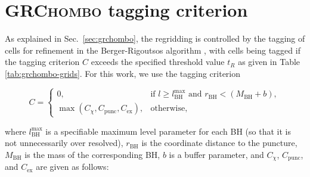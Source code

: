 \documentclass[floats,floatfix,showpacs,amssymb,physrev,twocolumn,superscriptaddress,reprint,
nofootinbib, longbibliography]{revtex4-2}
\begin{document}
\section{\textsc{GRChombo} tagging criterion}
\label{sec:tagging}
%
%
As explained in Sec.~\ref{sec:grchombo}, the regridding is controlled by 
the tagging of cells for refinement in the Berger-Rigoutsos algorithm 
\cite{Berger1991}, with cells being tagged if the tagging criterion $C$ 
exceeds the specified threshold value $t_R$ as given in Table 
\ref{tab:grchombo-grids}. For this work, we use the 
tagging criterion
\begin{widetext}
\begin{equation}
    C=
    \begin{cases}
        0, &\text{if }l\geq l_{\mathrm{BH}}^{\max}
        \text{ and } r_{\mathrm{BH}} < (M_{\mathrm{BH}}+b),\\
        \max(C_{\chi},C_{\mathrm{punc}},C_{\mathrm{ex}}),&
        \text{otherwise},
    \end{cases}
\end{equation}
\end{widetext}
where $l_{\mathrm{BH}}^{\max}$ is a specifiable maximum level parameter 
for each BH (so that it is not unnecessarily over resolved), 
$r_{\mathrm{BH}}$ is the coordinate distance to the puncture, 
$M_{\mathrm{BH}}$ is the mass of the corresponding BH, $b$ is a buffer 
parameter, and $C_\chi$, $C_{\mathrm{punc}}$, and $C_{\mathrm{ex}}$ are 
given as follows:
\end{document}
